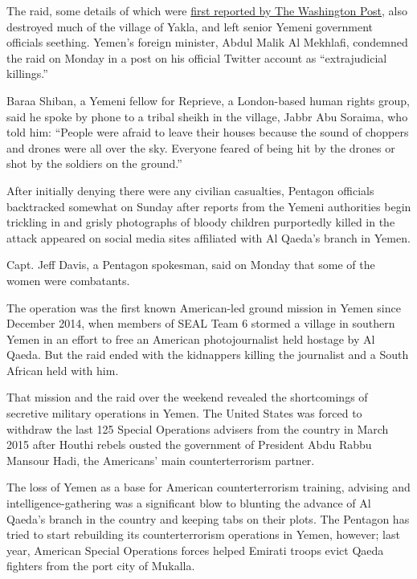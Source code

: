 The raid, some details of which were
\href{https://www.washingtonpost.com/news/checkpoint/wp/2017/01/31/how-trumps-first-counter-terror-operation-in-yemen-turned-into-chaos/?utm_term=.77066dbb6dc9}{first
reported by The Washington Post}, also destroyed much of the village of
Yakla, and left senior Yemeni government officials seething. Yemen's
foreign minister, Abdul Malik Al Mekhlafi, condemned the raid on Monday
in a post on his official Twitter account as ``extrajudicial killings.''

Baraa Shiban, a Yemeni fellow for Reprieve, a London-based human rights
group, said he spoke by phone to a tribal sheikh in the village, Jabbr
Abu Soraima, who told him: ``People were afraid to leave their houses
because the sound of choppers and drones were all over the sky. Everyone
feared of being hit by the drones or shot by the soldiers on the
ground.''

After initially denying there were any civilian casualties, Pentagon
officials backtracked somewhat on Sunday after reports from the Yemeni
authorities begin trickling in and grisly photographs of bloody children
purportedly killed in the attack appeared on social media sites
affiliated with Al Qaeda's branch in Yemen.

Capt. Jeff Davis, a Pentagon spokesman, said on Monday that some of the
women were combatants.

The operation was the first known American-led ground mission in Yemen
since December 2014, when members of SEAL Team 6 stormed a village in
southern Yemen in an effort to free an American photojournalist held
hostage by Al Qaeda. But the raid ended with the kidnappers killing the
journalist and a South African held with him.

That mission and the raid over the weekend revealed the shortcomings of
secretive military operations in Yemen. The United States was forced to
withdraw the last 125 Special Operations advisers from the country in
March 2015 after Houthi rebels ousted the government of President Abdu
Rabbu Mansour Hadi, the Americans' main counterterrorism partner.

The loss of Yemen as a base for American counterterrorism training,
advising and intelligence-gathering was a significant blow to blunting
the advance of Al Qaeda's branch in the country and keeping tabs on
their plots. The Pentagon has tried to start rebuilding its
counterterrorism operations in Yemen, however; last year, American
Special Operations forces helped Emirati troops evict Qaeda fighters
from the port city of Mukalla.

